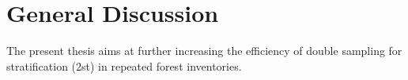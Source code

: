\chapter{General Discussion}
\label{chap:discussion}
The present thesis aims at further increasing the efficiency of double sampling for stratification (2st) in repeated forest inventories.
